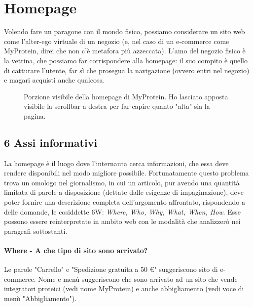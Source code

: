 \section{Homepage}
Volendo fare un paragone con il mondo fisico, possiamo considerare un sito web come l'alter-ego virtuale di un negozio (e, nel caso di un e-commerce come MyProtein, direi che non c'è metafora più azzeccata). L'amo del negozio fisico è la vetrina, che possiamo far corrispondere alla homepage: il suo compito è quello di catturare l'utente, far sì che prosegua la navigazione (ovvero entri nel negozio) e magari acquisti anche qualcosa.
\begin{figure}[!htb]
	\caption{\label{fig:figura1} Porzione visibile della homepage di MyProtein. Ho lasciato apposta visibile la scrollbar a destra per far capire quanto "alta" sia la pagina.}
\end{figure}
\subsection{6 Assi informativi}
\label{section:axes}
La homepage è il luogo dove l'internauta cerca informazioni, che essa deve rendere disponibili nel modo migliore possibile. Fortunatamente questo problema trova un omologo nel giornalismo, in cui un articolo, pur avendo una quantità limitata di parole a disposizione (dettate dalle esigenze di impaginazione), deve poter fornire una descrizione completa dell'argomento affrontato, rispondendo a delle domande, le cosiddette 6W: \textit{Where, Who, Why, What, When, How}. Esse possono essere reinterpretate in ambito web con le modalità che analizzerò nei paragrafi sottostanti.
\paragraph{Where - A che tipo di sito sono arrivato?}
Le parole "Carrello" e "Spedizione gratuita a 50 \euro" suggeriscono sito di e-commerce. Nome e menù suggeriscono che sono arrivato ad un sito che vende integratori proteici (vedi nome MyProtein) e anche abbigliamento (vedi voce di menù "Abbigliamento"). 


